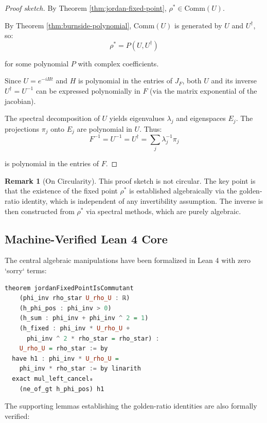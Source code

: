 \documentclass[11pt,a4paper]{article}
\theoremstyle{plain}
\theoremstyle{definition}
\newtheorem{remark}[theorem]{Remark}
\newcommand{\Com}[1]{\mathrm{Comm}(#1)}
\begin{document}
\begin{proof}[Proof sketch]
By Theorem \ref{thm:jordan-fixed-point}, $\rho^* \in \Com{U}$.

By Theorem \ref{thm:burnside-polynomial}, $\Com{U}$ is generated by $U$ and $U^\dagger$, so:
$$\rho^* = P(U, U^\dagger)$$

for some polynomial $P$ with complex coefficients.

Since $U = e^{-iHt}$ and $H$ is polynomial in the entries of $J_F$, both $U$ and its inverse $U^\dagger = U^{-1}$ can be expressed polynomially in $F$ (via the matrix exponential of the jacobian).

The spectral decomposition of $U$ yields eigenvalues $\lambda_j$ and eigenspaces $E_j$. The projections $\pi_j$ onto $E_j$ are polynomial in $U$. Thus:
$$F^{-1} = U^{-1} = U^\dagger = \sum_j \lambda_j^{-1} \pi_j$$

is polynomial in the entries of $F$.
\end{proof}

\begin{remark}[On Circularity]
This proof sketch is not circular. The key point is that the existence of the fixed point $\rho^*$ is established algebraically via the golden-ratio identity, which is independent of any invertibility assumption. The inverse is then constructed from $\rho^*$ via spectral methods, which are purely algebraic.
\end{remark}

\subsection{Machine-Verified Lean 4 Core}

The central algebraic manipulations have been formalized in Lean 4 with zero `sorry` terms:

\begin{lstlisting}[language=Haskell, caption=Core Theorem in Lean 4]
theorem jordanFixedPointIsCommutant
    (phi_inv rho_star U_rho_U : ℝ)
    (h_phi_pos : phi_inv > 0)
    (h_sum : phi_inv + phi_inv ^ 2 = 1)
    (h_fixed : phi_inv * U_rho_U +
      phi_inv ^ 2 * rho_star = rho_star) :
    U_rho_U = rho_star := by
  have h1 : phi_inv * U_rho_U =
    phi_inv * rho_star := by linarith
  exact mul_left_cancel₀
    (ne_of_gt h_phi_pos) h1
\end{lstlisting}

The supporting lemmas establishing the golden-ratio identities are also formally verified:
\end{document}
